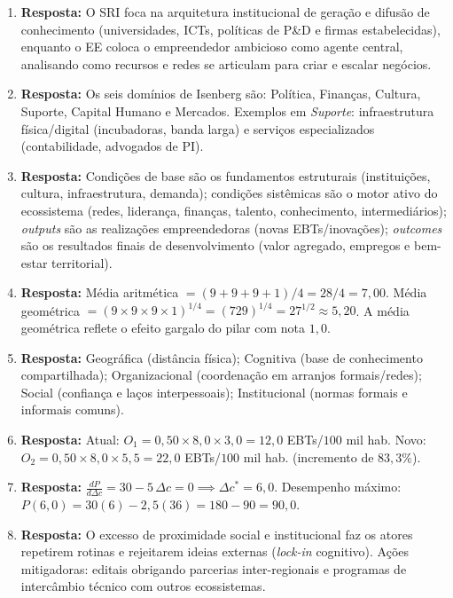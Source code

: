 \begin{boxGabarito}
\begin{enumerate}[leftmargin=1.6em, itemsep=4pt]
  \item \textbf{Resposta:} O SRI foca na arquitetura institucional de geração e difusão de conhecimento (universidades, ICTs, políticas de P\&D e firmas estabelecidas), enquanto o EE coloca o empreendedor ambicioso como agente central, analisando como recursos e redes se articulam para criar e escalar negócios.
  \item \textbf{Resposta:} Os seis domínios de Isenberg são: Política, Finanças, Cultura, Suporte, Capital Humano e Mercados. Exemplos em \textit{Suporte}: infraestrutura física/digital (incubadoras, banda larga) e serviços especializados (contabilidade, advogados de PI).
  \item \textbf{Resposta:} Condições de base são os fundamentos estruturais (instituições, cultura, infraestrutura, demanda); condições sistêmicas são o motor ativo do ecossistema (redes, liderança, finanças, talento, conhecimento, intermediários); \textit{outputs} são as realizações empreendedoras (novas EBTs/inovações); \textit{outcomes} são os resultados finais de desenvolvimento (valor agregado, empregos e bem-estar territorial).
  \item \textbf{Resposta:} Média aritmética $= (9+9+9+1)/4 = 28/4 = 7{,}00$. Média geométrica $= (9 \times 9 \times 9 \times 1)^{1/4} = (729)^{1/4} = 27^{1/2} \approx 5{,}20$. A média geométrica reflete o efeito gargalo do pilar com nota $1{,}0$.
  \item \textbf{Resposta:} Geográfica (distância física); Cognitiva (base de conhecimento compartilhada); Organizacional (coordenação em arranjos formais/redes); Social (confiança e laços interpessoais); Institucional (normas formais e informais comuns).
  \item \textbf{Resposta:} Atual: $O_1 = 0{,}50 \times 8{,}0 \times 3{,}0 = 12{,}0$ EBTs/$100$ mil hab. Novo: $O_2 = 0{,}50 \times 8{,}0 \times 5{,}5 = 22{,}0$ EBTs/$100$ mil hab. (incremento de $83{,}3\%$).
  \item \textbf{Resposta:} $\frac{dP}{d\Delta c} = 30 - 5\,\Delta c = 0 \implies \Delta c^* = 6{,}0$. Desempenho máximo: $P(6{,}0) = 30(6) - 2{,}5(36) = 180 - 90 = 90{,}0$.
  \item \textbf{Resposta:} O excesso de proximidade social e institucional faz os atores repetirem rotinas e rejeitarem ideias externas (\textit{lock-in} cognitivo). Ações mitigadoras: editais obrigando parcerias inter-regionais e programas de intercâmbio técnico com outros ecossistemas.

\end{enumerate}
\end{boxGabarito}
